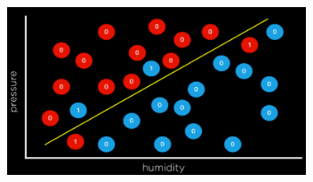 \documentclass[a4paper, titlepage]{article}
\begin{document}
\begin{figure}[H]
    \center
    \includegraphics[height=5cm]{Classification-img23.png}
    \label{Classification-img23}
    \caption{}
\end{figure}


\clearpage
\begin{thebibliography}{9}
\href{https://cs50.harvard.edu/ai/2024/}{}

\href{https://youtu.be/-g0iJjnO2_w?si=DVcD4dhUWdf8uKGn}{}

\href{https://en.wikipedia.org/wiki/Machine_learning}{}

\href{https://en.wikipedia.org/wiki/Regression_analysis}{}

\href{https://en.wikipedia.org/wiki/Linear_regression}{}

\href{https://youtu.be/R9OHn5ZF4Uo?si=PlffV1QOnI8nuaWO}{}

\href{https://mlu-explain.github.io/linear-regression/}{}


\end{thebibliography}
\end{document}
